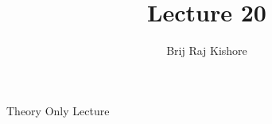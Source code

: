 \documentclass[12pt,twocolumn]{article}
\title{Lecture 20}
\date{}
\author{Brij Raj Kishore}
\begin{document}
	\maketitle
		Theory Only Lecture
\end{document}
